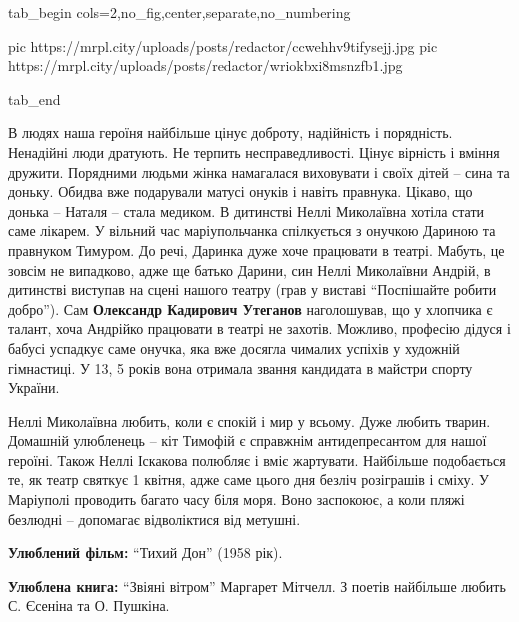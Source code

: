 \ifcmt
  tab_begin cols=2,no_fig,center,separate,no_numbering

  pic https://mrpl.city/uploads/posts/redactor/ccwehhv9tifysejj.jpg
  pic https://mrpl.city/uploads/posts/redactor/wriokbxi8msnzfb1.jpg

  tab_end
\fi

В людях наша героїня найбільше цінує доброту, надійність і порядність.
Ненадійні люди дратують. Не терпить несправедливості. Цінує вірність і вміння
дружити. Порядними людьми жінка намагалася виховувати і своїх дітей – сина та
доньку. Обидва вже подарували матусі онуків і навіть правнука. Цікаво, що
донька – Наталя – стала медиком. В дитинстві Неллі Миколаївна хотіла стати саме
лікарем. У вільний час маріупольчанка спілкується з онучкою Дариною та
правнуком Тимуром. До речі, Даринка дуже хоче працювати в театрі. Мабуть, це
зовсім не випадково, адже ще батько Дарини, син Неллі Миколаївни Андрій, в
дитинстві виступав на сцені нашого театру (грав у виставі \enquote{Поспішайте робити
добро}). Сам \textbf{Олександр Кадирович Утеганов} наголошував, що у хлопчика є талант,
хоча Андрійко працювати в театрі не захотів. Можливо, професію дідуся і бабусі
успадкує саме онучка, яка вже досягла чималих успіхів у художній гімнастиці. У
13, 5 років вона отримала звання кандидата в майстри спорту України.



Неллі Миколаївна любить, коли є спокій і мир у всьому. Дуже любить тварин.
Домашній улюбленець – кіт Тимофій є справжнім антидепресантом для нашої
героїні. Також Неллі Іскакова полюбляє і вміє жартувати. Найбільше подобається
те, як театр святкує 1 квітня, адже саме цього дня безліч розіграшів і сміху. У
Маріуполі проводить багато часу біля моря. Воно заспокоює, а коли пляжі
безлюдні – допомагає відволіктися від метушні.


\textbf{Улюблений фільм:} \enquote{Тихий Дон} (1958 рік).

\textbf{Улюблена книга:} \enquote{Звіяні вітром} Маргарет Мітчелл. З поетів найбільше любить С.
Єсеніна та О. Пушкіна.

